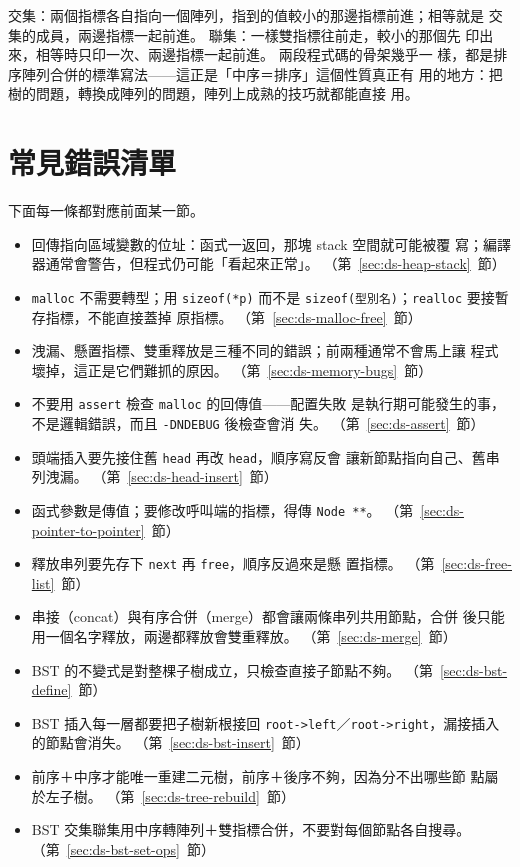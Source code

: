 
交集：兩個指標各自指向一個陣列，指到的值較小的那邊指標前進；相等就是
交集的成員，兩邊指標一起前進。 聯集：一樣雙指標往前走，較小的那個先
印出來，相等時只印一次、兩邊指標一起前進。 兩段程式碼的骨架幾乎一
樣，都是排序陣列合併的標準寫法——這正是「中序＝排序」這個性質真正有
用的地方：把樹的問題，轉換成陣列的問題，陣列上成熟的技巧就都能直接
用。


\section{常見錯誤清單}
\label{sec:ds-checklist}

下面每一條都對應前面某一節。

\begin{itemize}
\item 回傳指向區域變數的位址：函式一返回，那塊 stack 空間就可能被覆
寫；編譯器通常會警告，但程式仍可能「看起來正常」。
（第~\ref{sec:ds-heap-stack}~節）
\item \texttt{malloc} 不需要轉型；用 \texttt{sizeof(*p)} 而不是
\texttt{sizeof(型別名)}；\texttt{realloc} 要接暫存指標，不能直接蓋掉
原指標。
（第~\ref{sec:ds-malloc-free}~節）
\item 洩漏、懸置指標、雙重釋放是三種不同的錯誤；前兩種通常不會馬上讓
程式壞掉，這正是它們難抓的原因。
（第~\ref{sec:ds-memory-bugs}~節）
\item 不要用 \texttt{assert} 檢查 \texttt{malloc} 的回傳值——配置失敗
是執行期可能發生的事，不是邏輯錯誤，而且 \texttt{-DNDEBUG} 後檢查會消
失。
（第~\ref{sec:ds-assert}~節）
\item 頭端插入要先接住舊 \texttt{head} 再改 \texttt{head}，順序寫反會
讓新節點指向自己、舊串列洩漏。
（第~\ref{sec:ds-head-insert}~節）
\item 函式參數是傳值；要修改呼叫端的指標，得傳 \texttt{Node **}。
（第~\ref{sec:ds-pointer-to-pointer}~節）
\item 釋放串列要先存下 \texttt{next} 再 \texttt{free}，順序反過來是懸
置指標。
（第~\ref{sec:ds-free-list}~節）
\item 串接（concat）與有序合併（merge）都會讓兩條串列共用節點，合併
後只能用一個名字釋放，兩邊都釋放會雙重釋放。
（第~\ref{sec:ds-merge}~節）
\item BST 的不變式是對整棵子樹成立，只檢查直接子節點不夠。
（第~\ref{sec:ds-bst-define}~節）
\item BST 插入每一層都要把子樹新根接回
\texttt{root->left}／\texttt{root->right}，漏接插入的節點會消失。
（第~\ref{sec:ds-bst-insert}~節）
\item 前序＋中序才能唯一重建二元樹，前序＋後序不夠，因為分不出哪些節
點屬於左子樹。
（第~\ref{sec:ds-tree-rebuild}~節）
\item BST 交集聯集用中序轉陣列＋雙指標合併，不要對每個節點各自搜尋。
（第~\ref{sec:ds-bst-set-ops}~節）
\end{itemize}

